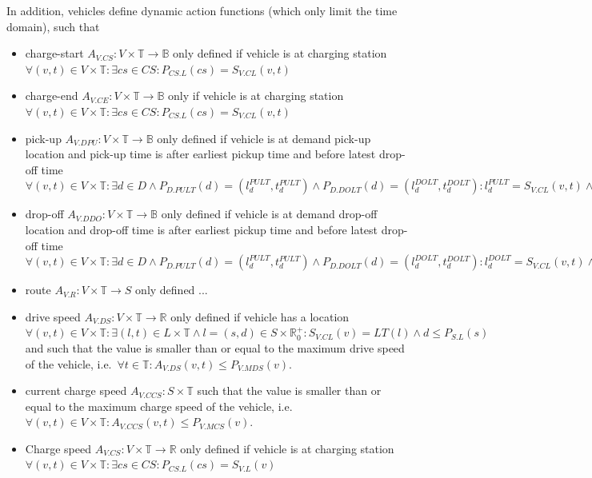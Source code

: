 \documentclass[graybox]{svmult}
\begin{document}
\noindent
In addition, vehicles define dynamic action functions (which only limit the time domain), such that

\begin{itemize}
	\item charge-start $A_{V.CS}: V \times \mathbb{T} \rightarrow \mathbb{B}$ only defined if vehicle is at charging station $\forall (v,t) \in V \times \mathbb{T}: \exists cs \in CS: P_{CS.L}(cs) = S_{V.CL}(v, t)$
	\item charge-end $A_{V.CE}: V \times \mathbb{T} \rightarrow \mathbb{B}$ only if vehicle is at charging station $\forall (v,t) \in V \times \mathbb{T}: \exists cs \in CS: P_{CS.L}(cs) = S_{V.CL}(v, t)$
	\item pick-up $A_{V.DPU}: V \times \mathbb{T} \rightarrow \mathbb{B}$ only defined if vehicle is at demand pick-up location and pick-up time is after earliest pickup time and before latest drop-off time $\forall (v,t) \in V \times \mathbb{T}: \exists d \in D \wedge  P_{D.PULT}(d) = (l_d^{PULT},t_d^{PULT}) \wedge P_{D.DOLT}(d) = (l_d^{DOLT},t_d^{DOLT}): l_d^{PULT} = S_{V.CL}(v,t) \wedge t_d^{PULT} \leq t \leq t_d^{DOLT}$
	\item drop-off $A_{V.DDO}: V \times \mathbb{T} \rightarrow \mathbb{B}$ only defined if vehicle is at demand drop-off location and drop-off time is after earliest pickup time and before latest drop-off time $\forall (v,t) \in V \times \mathbb{T}: \exists d \in D \wedge  P_{D.PULT}(d) = (l_d^{PULT},t_d^{PULT}) \wedge P_{D.DOLT}(d) = (l_d^{DOLT},t_d^{DOLT}): l_d^{DOLT} = S_{V.CL}(v,t) \wedge t_d^{PULT} \leq t \leq t_d^{DOLT}$
	\item route $A_{V.R}: V \times \mathbb{T} \rightarrow S$ only defined ...
	\item drive speed $A_{V.DS}: V \times \mathbb{T} \rightarrow \mathbb{R}$ only defined if vehicle has a location $\forall (v,t) \in V \times \mathbb{T}: \exists (l, t) \in L \times \mathbb{T} \wedge l = (s, d) \in S \times \mathbb{R}_0^+: S_{V.CL}(v) = LT(l) \wedge d \leq P_{S.L}(s)$ and such that the value is smaller than or equal to the maximum drive speed of the vehicle, i.e.\ $\forall t \in \mathbb{T}: A_{V.DS}(v,t) \leq P_{V.MDS}(v)$.
		\item current charge speed $A_{V.CCS}: S \times \mathbb{T}$ such that the value is smaller than or equal to the maximum charge speed of the vehicle, i.e.\ $\forall (v,t) \in V \times \mathbb{T}: A_{V.CCS}(v,t) \leq P_{V.MCS}(v)$.
	

	
	\item Charge speed $A_{V.CS}: V \times \mathbb{T} \rightarrow \mathbb{R}$ only defined if vehicle is at charging station $\forall (v,t) \in V \times \mathbb{T}: \exists cs \in CS: P_{CS.L}(cs) = S_{V.L}(v)$
\end{itemize}
\end{document}
